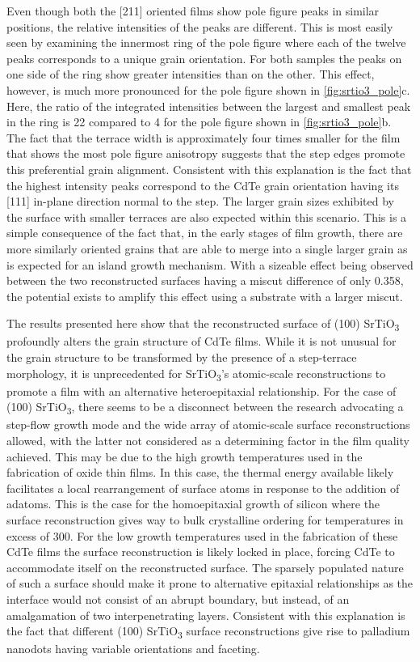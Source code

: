 Even though both the [211] oriented films show pole figure peaks in similar positions, the relative intensities of the peaks are different.
This is most easily seen by examining the innermost ring of the pole figure where each of the twelve peaks corresponds to a unique grain orientation.
For both samples the peaks on one side of the ring show greater intensities than on the other.
This effect, however, is much more pronounced for the pole figure shown in \cref{fig:srtio3_pole}c.
Here, the ratio of the integrated intensities between the largest and smallest peak in the ring is 22 compared to 4 for the pole figure shown in \cref{fig:srtio3_pole}b.
The fact that the terrace width is approximately four times smaller for the film that shows the most pole figure anisotropy suggests that the step edges promote this preferential grain alignment.
Consistent with this explanation is the fact that the highest intensity peaks correspond to the CdTe grain orientation having its [111] in-plane direction normal to the step.
The larger grain sizes exhibited by the surface with smaller terraces are also expected within this scenario.
This is a simple consequence of the fact that, in the early stages of film growth, there are more similarly oriented grains that are able to merge into a single larger grain as is expected for an island growth mechanism.
With a sizeable effect being observed between the two reconstructed surfaces having a miscut difference of only 0.358\degree{}, the potential exists to amplify this effect using a substrate with a larger miscut.

The results presented here show that the reconstructed surface of (100) SrTiO\textsubscript{3} profoundly alters the grain structure of CdTe films.
While it is not unusual for the grain structure to be transformed by the presence of a step-terrace morphology, it is unprecedented for SrTiO\textsubscript{3}'s atomic-scale reconstructions to promote a film with an alternative heteroepitaxial relationship.
For the case of (100) SrTiO\textsubscript{3}, there seems to be a disconnect between the research advocating a step-flow growth mode and the wide array of atomic-scale surface reconstructions allowed, with the latter not considered as a determining factor in the film quality achieved.
This may be due to the high growth temperatures used in the fabrication of oxide thin films.
In this case, the thermal energy available likely facilitates a local rearrangement of surface atoms in response to the addition of adatoms.
This is the case for the homoepitaxial growth of silicon where the surface reconstruction gives way to bulk crystalline ordering for temperatures in excess of 300\celsius{}\cite{Gossmann1985}.
For the low growth temperatures used in the fabrication of these CdTe films the surface reconstruction is likely locked in place, forcing CdTe to accommodate itself on the reconstructed surface.
The sparsely populated nature of such a surface should make it prone to alternative epitaxial relationships as the interface would not consist of an abrupt boundary, but instead, of an amalgamation of two interpenetrating layers.
Consistent with this explanation is the fact that different (100) SrTiO\textsubscript{3} surface reconstructions give rise to palladium nanodots having variable orientations and faceting\cite{Silly2005b}.
